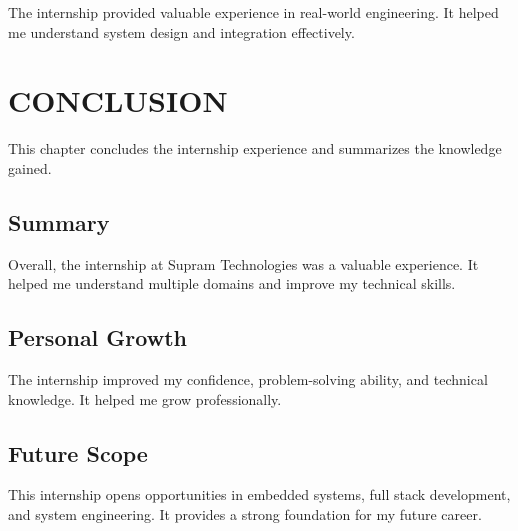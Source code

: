 \documentclass[12pt,a4paper]{report}
\begin{document}
The internship provided valuable experience in real-world engineering. It helped me understand system design and integration effectively.




\chapter{CONCLUSION}


This chapter concludes the internship experience and summarizes the knowledge gained.




\section{Summary}

Overall, the internship at Supram Technologies was a valuable experience. It helped me understand multiple domains and improve my technical skills.


\section{Personal Growth}

The internship improved my confidence, problem-solving ability, and technical knowledge. It helped me grow professionally.


\section{Future Scope}

This internship opens opportunities in embedded systems, full stack development, and system engineering. It provides a strong foundation for my future career.
\end{document}
